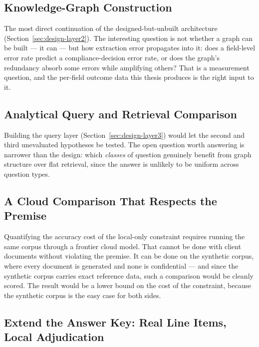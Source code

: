 \subsection{Knowledge-Graph Construction}
\label{sec:fw-kg}

The most direct continuation of the designed-but-unbuilt architecture
(Section~\ref{sec:design-layer2}). The interesting question is not whether a graph can be built --- it
can --- but how extraction error propagates into it: does a field-level error rate predict a
compliance-decision error rate, or does the graph's redundancy absorb some errors while amplifying
others? That is a measurement question, and the per-field outcome data this thesis produces is the
right input to it.

\subsection{Analytical Query and Retrieval Comparison}
\label{sec:fw-query}

Building the query layer (Section~\ref{sec:design-layer3}) would let the second and third unevaluated
hypotheses be tested. The open question worth answering is narrower than the design: which
\emph{classes} of question genuinely benefit from graph structure over flat retrieval, since the
answer is unlikely to be uniform across question types.

\subsection{A Cloud Comparison That Respects the Premise}
\label{sec:fw-cloud}

Quantifying the accuracy cost of the local-only constraint requires running the same corpus
through a frontier cloud model. That cannot be done with client documents without violating the
premise. It can be done on the synthetic corpus, where every document is generated and none is
confidential --- and since the synthetic corpus carries exact reference data, such a comparison
would be cleanly scored. The result would be a lower bound on the cost of the constraint, because
the synthetic corpus is the easy case for both sides.

\subsection{Extend the Answer Key: Real Line Items, Local Adjudication}
\label{sec:fw-local-gt}
\label{sec:fw-groups}

